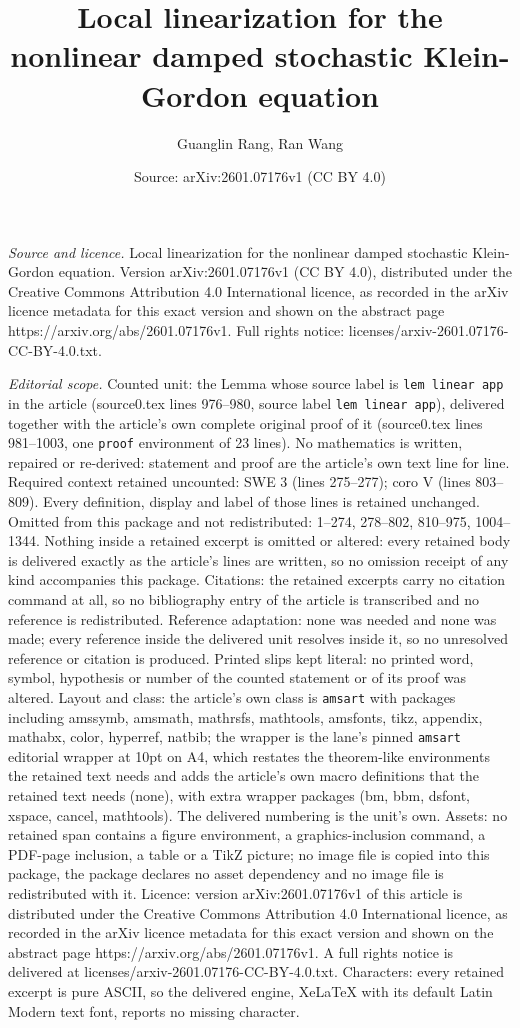 \documentclass[10pt,a4paper]{amsart}
\title[Local linearization for the nonlinear damped stochastic Klei]{Local linearization for the nonlinear damped stochastic Klein-Gordon equation}
\author{Guanglin Rang, Ran Wang}
\date{Source: arXiv:2601.07176v1 (CC BY 4.0)}
\begin{document}
\maketitle

\noindent\emph{Source and licence.} Local linearization for the nonlinear damped stochastic Klein-Gordon equation. Version arXiv:2601.07176v1 (CC BY 4.0), distributed under the Creative Commons Attribution 4.0 International licence, as recorded in the arXiv licence metadata for this exact version and shown on the abstract page https://arxiv.org/abs/2601.07176v1. Full rights notice: licenses/arxiv-2601.07176-CC-BY-4.0.txt.\par\smallskip

\noindent\textit{Editorial scope.} Counted unit: the Lemma whose source label is \texttt{lem linear app} in the article (source0.tex lines 976--980, source label \texttt{lem linear app}), delivered together with the article's own complete original proof of it (source0.tex lines 981--1003, one \texttt{proof} environment of 23 lines). No mathematics is written, repaired or re-derived: statement and proof are the article's own text line for line. Required context retained uncounted: SWE 3 (lines 275--277); coro V (lines 803--809). Every definition, display and label of those lines is retained unchanged. Omitted from this package and not redistributed: 1--274, 278--802, 810--975, 1004--1344. Nothing inside a retained excerpt is omitted or altered: every retained body is delivered exactly as the article's lines are written, so no omission receipt of any kind accompanies this package. Citations: the retained excerpts carry no citation command at all, so no bibliography entry of the article is transcribed and no reference is redistributed. Reference adaptation: none was needed and none was made; every reference inside the delivered unit resolves inside it, so no unresolved reference or citation is produced. Printed slips kept literal: no printed word, symbol, hypothesis or number of the counted statement or of its proof was altered. Layout and class: the article's own class is \texttt{amsart} with packages including amssymb, amsmath, mathrsfs, mathtools, amsfonts, tikz, appendix, mathabx, color, hyperref, natbib; the wrapper is the lane's pinned \texttt{amsart} editorial wrapper at 10pt on A4, which restates the theorem-like environments the retained text needs and adds the article's own macro definitions that the retained text needs (none), with extra wrapper packages (bm, bbm, dsfont, xspace, cancel, mathtools). The delivered numbering is the unit's own. Assets: no retained span contains a figure environment, a graphics-inclusion command, a PDF-page inclusion, a table or a TikZ picture; no image file is copied into this package, the package declares no asset dependency and no image file is redistributed with it. Licence: version arXiv:2601.07176v1 of this article is distributed under the Creative Commons Attribution 4.0 International licence, as recorded in the arXiv licence metadata for this exact version and shown on the abstract page https://arxiv.org/abs/2601.07176v1. A full rights notice is delivered at licenses/arxiv-2601.07176-CC-BY-4.0.txt. Characters: every retained excerpt is pure ASCII, so the delivered engine, XeLaTeX with its default Latin Modern text font, reports no missing character.
\end{document}

